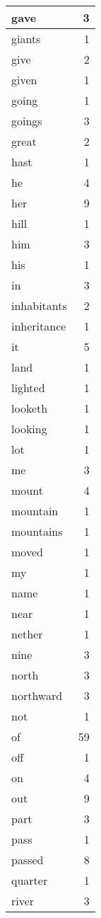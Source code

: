 \begin{center}
\begin{longtable}{l|r}
gave & 3\\ \hline 
giants & 1\\ \hline 
give & 2\\ \hline 
given & 1\\ \hline 
going & 1\\ \hline 
goings & 3\\ \hline 
great & 2\\ \hline 
hast & 1\\ \hline 
he & 4\\ \hline 
her & 9\\ \hline 
hill & 1\\ \hline 
him & 3\\ \hline 
his & 1\\ \hline 
in & 3\\ \hline 
inhabitants & 2\\ \hline 
inheritance & 1\\ \hline 
it & 5\\ \hline 
land & 1\\ \hline 
lighted & 1\\ \hline 
looketh & 1\\ \hline 
looking & 1\\ \hline 
lot & 1\\ \hline 
me & 3\\ \hline 
mount & 4\\ \hline 
mountain & 1\\ \hline 
mountains & 1\\ \hline 
moved & 1\\ \hline 
my & 1\\ \hline 
name & 1\\ \hline 
near & 1\\ \hline 
nether & 1\\ \hline 
nine & 3\\ \hline 
north & 3\\ \hline 
northward & 3\\ \hline 
not & 1\\ \hline 
of & 59\\ \hline 
off & 1\\ \hline 
on & 4\\ \hline 
out & 9\\ \hline 
part & 3\\ \hline 
pass & 1\\ \hline 
passed & 8\\ \hline 
quarter & 1\\ \hline 
river & 3\\ \hline 

\end{longtable}
\end{center}
